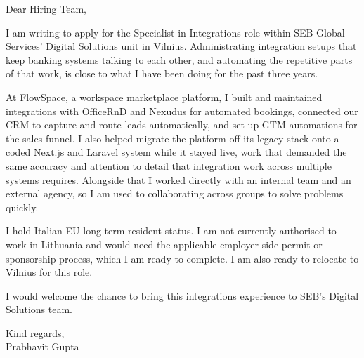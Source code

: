\documentclass[a4paper,11pt]{article}
\begin{document}
Dear Hiring Team,

I am writing to apply for the Specialist in Integrations role within SEB Global Services' Digital Solutions unit in Vilnius. Administrating integration setups that keep banking systems talking to each other, and automating the repetitive parts of that work, is close to what I have been doing for the past three years.

At FlowSpace, a workspace marketplace platform, I built and maintained integrations with OfficeRnD and Nexudus for automated bookings, connected our CRM to capture and route leads automatically, and set up GTM automations for the sales funnel. I also helped migrate the platform off its legacy stack onto a coded Next.js and Laravel system while it stayed live, work that demanded the same accuracy and attention to detail that integration work across multiple systems requires. Alongside that I worked directly with an internal team and an external agency, so I am used to collaborating across groups to solve problems quickly.

I hold Italian EU long term resident status. I am not currently authorised to work in Lithuania and would need the applicable employer side permit or sponsorship process, which I am ready to complete. I am also ready to relocate to Vilnius for this role.

I would welcome the chance to bring this integrations experience to SEB's Digital Solutions team.

Kind regards,\\
Prabhavit Gupta
\end{document}
